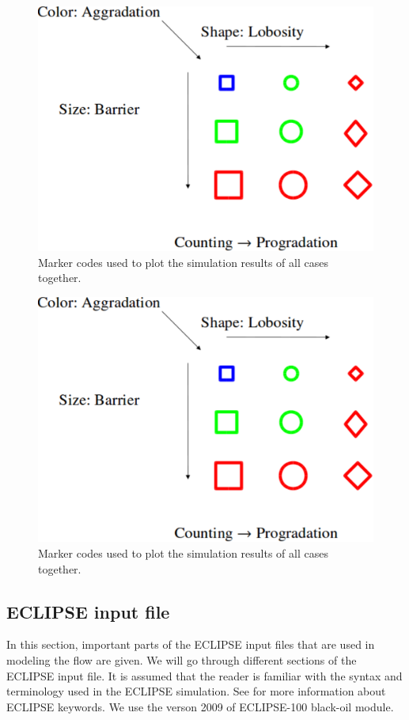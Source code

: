 \begin{figure}
  \centering
  \includegraphics[width=0.65 \linewidth]{./figurer/codes} 
  \caption{Marker codes used to plot the simulation results of all cases
together.}
  \label{fig:codes}
%
\end{figure}

\begin{figure}
  \centering
  \includegraphics[width=0.65 \linewidth]{./figurer/codes} 
  \caption{Marker codes used to plot the simulation results of all cases
together.}
  \label{fig:STL_1}
%
\end{figure}



\subsection{ECLIPSE input file}
\label{eclDataFile}

In this section, important parts of the ECLIPSE input files that are used in modeling the flow are given. We will go through different sections of the ECLIPSE input file. It is assumed that the reader is familiar with the syntax and terminology used in the ECLIPSE simulation. See \cite{sis2007eclipse} for more information about ECLIPSE keywords. We use the verson 2009 of ECLIPSE-100 black-oil module.

